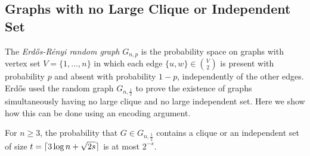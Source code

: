 \documentclass{patmorin}
\begin{document}
\subsection{Graphs with no Large Clique or Independent Set}

The \emph{Erd\H{o}s-R\'enyi random graph} $G_{n,p}$ is the
probability space on
graphs with vertex set $V=\{1,\ldots,n\}$ in which each edge $\{u,
w\} \in \binom{V}{2}$ is present with probability $p$ and absent with
probability $1-p$, independently of the other edges.  Erd\H{o}s
\cite{erdos:some} used the random graph $G_{n,\frac{1}{2}}$ to prove
the existence of graphs simultaneously having no large clique and no large
independent set. Here we show how this can be done using an encoding
argument.

\begin{thm}
  For $n \ge 3$, the probability that $G \in G_{n,\frac{1}{2}}$
  contains a clique or an independent set of size $t = {\lceil 3\log n +
    \sqrt{2s} \rceil}$ is at most $2^{-s}$.
\end{thm}
\end{document}
